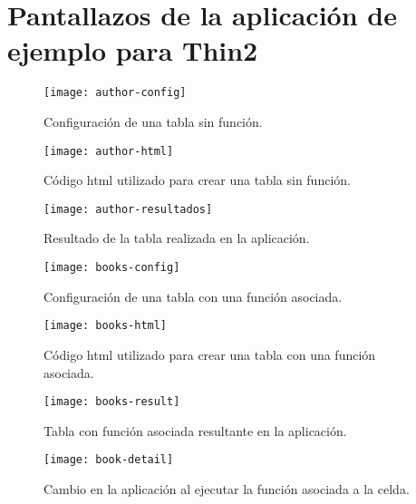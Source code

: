 \chapter{Pantallazos de la aplicación de ejemplo para Thin2}
\label{apendiceB}

\begin{figure}[h!]
\centering
\texttt{[image: author-config]}
\caption[Configuración de tabla sencilla]{Configuración de una tabla sin función.}
\label{author:1}
\end{figure}

\begin{figure}[h!]
\centering
\texttt{[image: author-html]}
\caption[Código html de tabla sencilla]{Código html utilizado para crear una tabla sin función.}
\label{author:2}
\end{figure}

\begin{figure}[h!]
\centering
\texttt{[image: author-resultados]}
\caption[Tabla sencilla en aplicación]{Resultado de la tabla realizada en la aplicación.}
\label{author:3}
\end{figure}

\begin{figure}[h!]
\centering
\texttt{[image: books-config]}
\caption[Configuración de tabla con evento]{Configuración de una tabla con una función asociada.}
\label{books:1}
\end{figure}

\begin{figure}[h!]
\centering
\texttt{[image: books-html]}
\caption[Código html de tabla con evento]{Código html utilizado para crear una tabla con una función asociada.}
\label{books:2}
\end{figure}

\begin{figure}[h!]
\centering
\texttt{[image: books-result]}
\caption[Tabla con evento en aplicación]{Tabla con función asociada resultante en la aplicación.}
\label{books:3}
\end{figure}

\begin{figure}[h!]
\centering
\texttt{[image: book-detail]}
\caption[Página al hacer click en la tabla]{Cambio en la aplicación al ejecutar la función asociada a la celda.}
\label{books:4}
\end{figure}
